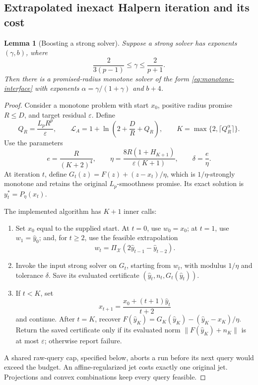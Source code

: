 \documentclass[11pt]{article}
\numberwithin{equation}{section}
\newtheorem{lemma}[theorem]{Lemma}
\theoremstyle{definition}
\theoremstyle{remark}
\begin{document}
\subsection{Extrapolated inexact Halpern iteration and its cost}

\begin{lemma}[Boosting a strong solver]\label{lem:strong-boost}
Suppose a strong solver has exponents \((\gamma,b)\), where
\begin{equation}\label{eq:boost-exponent-range}
\frac{2}{3(p-1)}\le\gamma\le\frac{2}{p+1}.
\end{equation}
Then there is a promised-radius monotone solver of the form
\eqref{eq:monotone-interface} with exponents
\(\alpha=\gamma/(1+\gamma)\) and \(b+4\).
\end{lemma}

\begin{proof}
Consider a monotone problem with start \(x_0\), positive radius promise
\(R\le D\), and target residual \(\varepsilon\). Define
\[
Q_R=\frac{L_pR^p}{\varepsilon},\qquad
\mathcal L_A=1+\ln\!\left(2+\frac DR+Q_R\right),\qquad
K=\max\{2,\lceil Q_R^\alpha\rceil\}.
\]
Use the parameters
\begin{equation}\label{eq:halpern-parameters}
e=\frac{R}{(K+2)^4},\qquad
\eta=\frac{8R(1+H_{K+1})}{\varepsilon(K+1)},\qquad
\delta=\frac e\eta.
\end{equation}
At iteration \(t\), define
\(G_t(z)=F(z)+(z-x_t)/\eta\), which is \(1/\eta\)-strongly monotone
and retains the original \(L_p\)-smoothness promise. Its exact solution
is \(y_t^*=P_\eta(x_t)\).

The implemented algorithm has \(K+1\) inner calls:
\begin{enumerate}[label=\arabic*.,leftmargin=*]
\item Set \(x_0\) equal to the supplied start. At \(t=0\), use
\(w_0=x_0\); at \(t=1\), use \(w_1=\widehat y_0\); and, for
\(t\ge2\), use the feasible extrapolation
\[
w_t=\Pi_{\mathcal X}(2\widehat y_{t-1}-\widehat y_{t-2}).
\]
\item Invoke the input strong solver on \(G_t\), starting from \(w_t\),
with modulus \(1/\eta\) and tolerance \(\delta\). Save its evaluated
certificate \((\widehat y_t,n_t,G_t(\widehat y_t))\).
\item If \(t<K\), set
\[
x_{t+1}=\frac{x_0+(t+1)\widehat y_t}{t+2}
\]
and continue. After \(t=K\), recover
\(F(\widehat y_K)=G_K(\widehat y_K)-(\widehat y_K-x_K)/\eta\).
Return the saved certificate only if its evaluated norm
\(\|F(\widehat y_K)+n_K\|\) is at most \(\varepsilon\); otherwise
report failure.
\end{enumerate}
A shared raw-query cap, specified below, aborts a run before its next
query would exceed the budget. An affine-regularized jet costs exactly
one original jet. Projections and convex combinations keep every query
feasible.


\end{proof}
\end{document}
